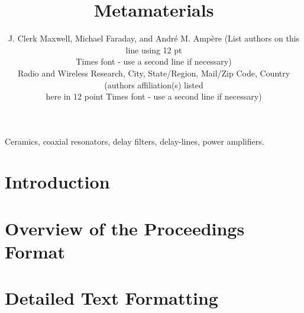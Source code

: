 \documentclass[10pt,conference,letterpaper]{RWWTemplate}
\title{Metamaterials}
\author{%
J. Clerk Maxwell, Michael Faraday, and Andr\'{e} M. Amp\`{e}re (List authors
on this line using 12 pt\\
Times font - use a second line if necessary)%
\vspace{12pt}\\
Radio and Wireless Research, City, State/Region, Mail/Zip Code, Country
(authors affiliation(s) listed \\
here in 12 point Times font - use a second line if necessary)%
}
\begin{document}
\maketitle

%
\begin{abstract}

\end{abstract}

\begin{keywords}
Ceramics, coaxial resonators, delay filters, delay-lines, power amplifiers.
\end{keywords}

\section{Introduction}
%

\section{Overview of the Proceedings Format}

\section{Detailed Text Formatting}
\label{sec:page style}
\end{document}
